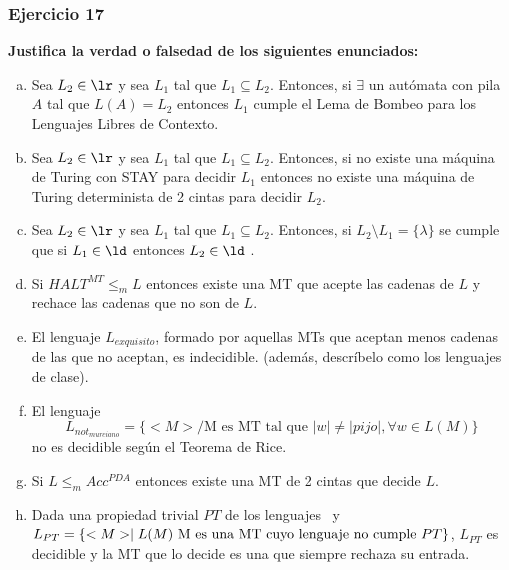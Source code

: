 \documentclass{article}
\begin{document}
\subsubsection*{Ejercicio 17} \textbf{Justifica la verdad o falsedad de los siguientes enunciados:}
\begin{enumerate}[a)]


\item Sea $L_2 \in \lr$ y sea $L_1$ tal que $L_1 \subseteq L_2$. Entonces, si $\exists$ un autómata con pila $A$ tal que $L(A)=L_2$ entonces $L_1$ cumple el Lema de Bombeo para los Lenguajes Libres de Contexto. 
\item Sea $L_2 \in \lr$ y sea $L_1$ tal que $L_1 \subseteq L_2$. Entonces, si no  existe una máquina de Turing con  STAY para decidir $L_1$ entonces no existe una máquina de Turing determinista de 2 cintas para decidir $L_2$.

\item Sea $L_2 \in \lr$ y sea $L_1$ tal que $L_1 \subseteq L_2$. Entonces, si $L_2 \setminus L_1=\{\lambda\}$ se cumple que si $L_1 \in \ld$ entonces $L_2 \in \ld$ .

\item Si $HALT^{MT} \le_m L$ entonces existe una MT  que acepte las cadenas de $L$ y rechace las cadenas que no son de $L$.
\item El lenguaje $L_{exquisito}$, formado por aquellas MTs que aceptan menos cadenas de las que no aceptan, es indecidible. (además, descríbelo como los lenguajes de clase).  

\item El lenguaje $$L_{not_{murciano}}=\{<M> / \mbox{M es MT  tal que } |w|\neq |pijo|,  \forall w \in L(M) \}$$  no es decidible según el Teorema de Rice.
\item Si $L\le_m  Acc^{PDA}$ entonces existe una MT de 2 cintas que decide $L$. 

\item Dada  una propiedad trivial $PT$ de los lenguajes \lr\  y $L_{PT}=\{<M> \mid L(M) \hbox{ M es una MT cuyo lenguaje no cumple } PT\}$, $L_{PT}$ es decidible y la MT que lo decide es una que siempre rechaza su entrada.

\end{enumerate}

 
\end{document}
